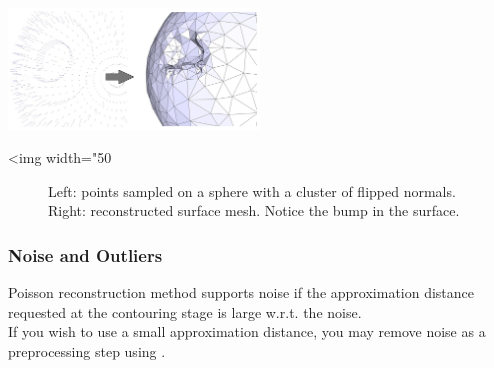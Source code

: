 \begin{center}
    \label{Surface_reconstruction_points_3-fig-flipped_normals}
    \begin{ccTexOnly}
      \includegraphics[width=0.5\textwidth]{Surface_reconstruction_points_3/flipped_normals} %
    \end{ccTexOnly}
    \begin{ccHtmlOnly}
        <img width="50%
    \end{ccHtmlOnly}
    \begin{figure}[h]
        \caption{Left: points sampled on a sphere with a cluster of flipped normals.
                 Right: reconstructed surface mesh. Notice the bump in the surface.}
    \end{figure}
\end{center}


\subsubsection{Noise and Outliers}

Poisson reconstruction method supports noise if the approximation distance requested at the contouring stage is large w.r.t. the noise.\\
If you wish to use a small approximation distance, you may remove noise as a preprocessing step using .

